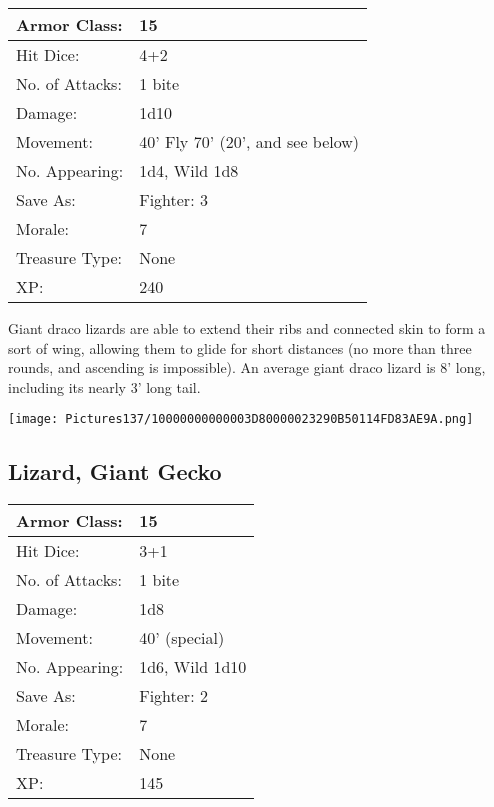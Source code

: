 \documentclass[a4paper,twoside,openany,10pt]{book}
\begin{document}
\begin{multicols}{2}
\begin{tabularx}{0.50\textwidth}{@{}lX@{}}
Armor Class: & 15 \\\hline
Hit Dice: & 4+2 \\\hline
No. of Attacks: & 1 bite \\\hline
Damage: & 1d10 \\\hline
Movement: & 40' Fly 70'
(20', and see below) \\\hline
No. Appearing: & 1d4, Wild 1d8 \\\hline
Save As: & Fighter: 3 \\\hline
Morale: & 7 \\\hline
Treasure Type: & None \\\hline
XP: & 240 \\\hline
\end{tabularx}\medskip

Giant draco lizards are able to extend their ribs and connected skin to
form a sort of wing, allowing them to glide for short distances (no more
than three rounds, and ascending is impossible). An average giant draco
lizard is 8' long, including its nearly
3' long tail.

\begin{center} \texttt{[image: Pictures137/10000000000003D80000023290B50114FD83AE9A.png]} \end{center}


\subsection*{Lizard, Giant Gecko}\label{lizard-giant-gecko}

\begin{tabularx}{0.50\textwidth}{@{}lX@{}}
Armor Class: & 15 \\\hline
Hit Dice: & 3+1 \\\hline
No. of Attacks: & 1 bite \\\hline
Damage: & 1d8 \\\hline
Movement: & 40' (special) \\\hline
No. Appearing: & 1d6, Wild 1d10 \\\hline
Save As: & Fighter: 2 \\\hline
Morale: & 7 \\\hline
Treasure Type: & None \\\hline
XP: & 145 \\\hline
\end{tabularx}\medskip


\end{multicols}
\end{document}
